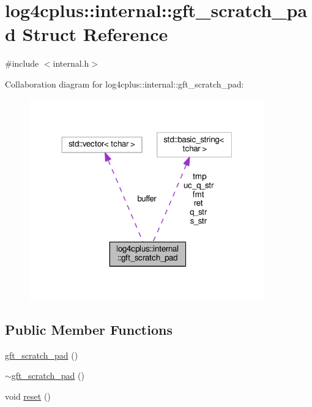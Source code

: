 \hypertarget{structlog4cplus_1_1internal_1_1gft__scratch__pad}{\section{log4cplus\-:\-:internal\-:\-:gft\-\_\-scratch\-\_\-pad Struct Reference}
\label{structlog4cplus_1_1internal_1_1gft__scratch__pad}
}


{\ttfamily \#include $<$internal.\-h$>$}



Collaboration diagram for log4cplus\-:\-:internal\-:\-:gft\-\_\-scratch\-\_\-pad\-:
\nopagebreak
\begin{figure}[H]
\begin{center}
\leavevmode
\includegraphics[width=287pt]{structlog4cplus_1_1internal_1_1gft__scratch__pad__coll__graph}
\end{center}
\end{figure}
\subsection*{Public Member Functions}
\begin{DoxyCompactItemize}
\item 
\hyperlink{structlog4cplus_1_1internal_1_1gft__scratch__pad_a60ee2ef27138fe2385148027b2c20057}{gft\-\_\-scratch\-\_\-pad} ()
\item 
\hyperlink{structlog4cplus_1_1internal_1_1gft__scratch__pad_ac1af4616827b4985c5047baa679c62ec}{$\sim$gft\-\_\-scratch\-\_\-pad} ()
\item 
void \hyperlink{structlog4cplus_1_1internal_1_1gft__scratch__pad_ad08e596ced3f270772a8f3a41d6a0d39}{reset} ()
\end{DoxyCompactItemize}
